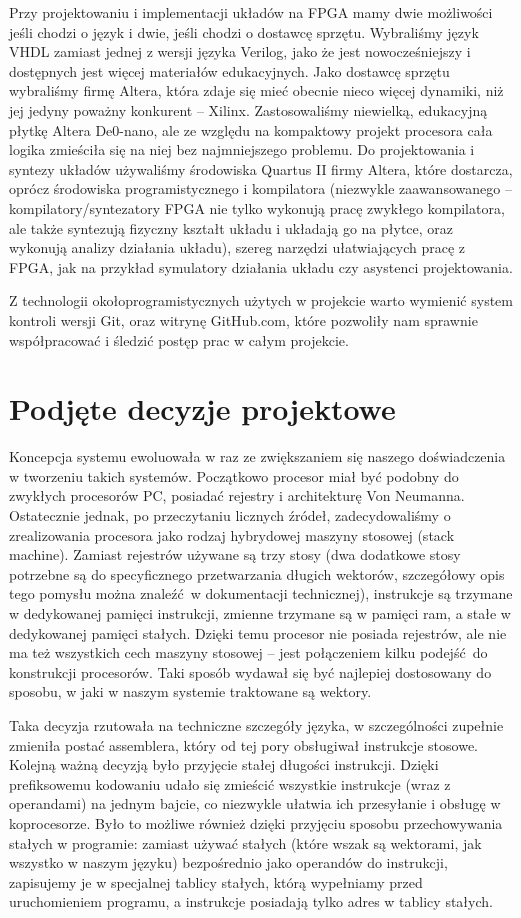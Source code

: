Przy projektowaniu i implementacji układów na FPGA mamy dwie możliwości jeśli chodzi o język i dwie, jeśli chodzi o dostawcę sprzętu. Wybraliśmy język VHDL zamiast jednej z wersji języka Verilog, jako że jest nowocześniejszy i dostępnych jest więcej materiałów edukacyjnych. Jako dostawcę sprzętu wybraliśmy firmę Altera, która zdaje się mieć obecnie nieco więcej dynamiki, niż jej jedyny poważny konkurent -- Xilinx. Zastosowaliśmy niewielką, edukacyjną płytkę Altera De0-nano, ale ze względu na kompaktowy projekt procesora cała logika zmieściła się na niej bez najmniejszego problemu. Do projektowania i syntezy układów używaliśmy środowiska Quartus II firmy Altera, które dostarcza, oprócz środowiska programistycznego i kompilatora (niezwykle zaawansowanego -- kompilatory/syntezatory FPGA nie tylko wykonują pracę zwykłego kompilatora, ale także syntezują fizyczny kształt układu i układają go na płytce, oraz wykonują analizy działania układu), szereg narzędzi ułatwiających pracę z FPGA, jak na przykład symulatory działania układu czy asystenci projektowania.

Z technologii okołoprogramistycznych użytych w projekcie warto wymienić system kontroli wersji Git, oraz witrynę GitHub.com, które pozwoliły nam sprawnie współpracować i śledzić postęp prac w całym projekcie.

\section{Podjęte decyzje projektowe}
Koncepcja systemu ewoluowała w raz ze zwiększaniem się naszego doświadczenia w tworzeniu takich systemów. Początkowo procesor miał być podobny do zwykłych procesorów PC, posiadać rejestry i architekturę Von Neumanna. Ostatecznie jednak, po przeczytaniu licznych źródeł, zadecydowaliśmy o zrealizowania procesora jako rodzaj hybrydowej maszyny stosowej (stack machine). Zamiast rejestrów używane są trzy stosy (dwa dodatkowe stosy potrzebne są do specyficznego przetwarzania długich wektorów, szczegółowy opis tego pomysłu można znaleźć w dokumentacji technicznej), instrukcje są trzymane w dedykowanej pamięci instrukcji, zmienne trzymane są w pamięci ram, a stałe w dedykowanej pamięci stałych. Dzięki temu procesor nie posiada rejestrów, ale nie ma też wszystkich cech maszyny stosowej -- jest połączeniem kilku podejść do konstrukcji procesorów. Taki sposób wydawał się być najlepiej dostosowany do sposobu, w jaki w naszym systemie traktowane są wektory.

Taka decyzja rzutowała na techniczne szczegóły języka, w szczególności zupełnie zmieniła postać assemblera, który od tej pory obsługiwał instrukcje stosowe. Kolejną ważną decyzją było przyjęcie stałej długości instrukcji. Dzięki prefiksowemu kodowaniu udało się zmieścić wszystkie instrukcje (wraz z operandami) na jednym bajcie, co niezwykle ułatwia ich przesyłanie i obsługę w koprocesorze. Było to możliwe również dzięki przyjęciu sposobu przechowywania stałych w programie: zamiast używać stałych (które wszak są wektorami, jak wszystko w naszym języku) bezpośrednio jako operandów do instrukcji, zapisujemy je w specjalnej tablicy stałych, którą wypełniamy przed uruchomieniem programu, a instrukcje posiadają tylko adres w tablicy stałych.
